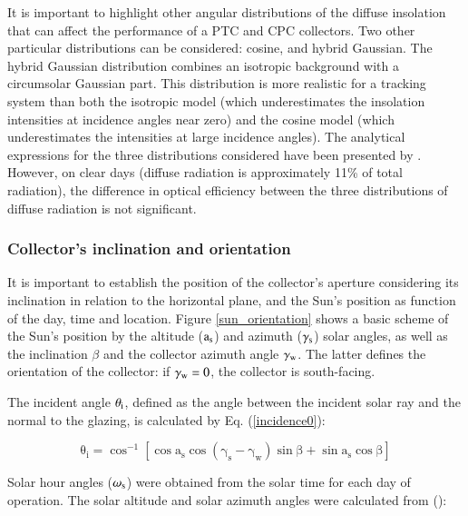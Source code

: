 It is important to highlight other angular distributions of the diffuse insolation that can affect the performance of a PTC and CPC collectors. Two other particular distributions can be considered: cosine, and hybrid Gaussian. The hybrid Gaussian distribution combines an isotropic background with a circumsolar Gaussian part. This distribution is more realistic for a tracking system than both the isotropic model (which underestimates the insolation intensities at incidence angles near zero) and the cosine model (which underestimates the intensities at large incidence angles). The analytical expressions for the three distributions considered have been presented by \citet{Prapas1987}. However, on clear days (diffuse radiation is approximately 11\% of total radiation), the difference in optical efficiency between the three distributions of diffuse radiation is not significant.

\subsubsection{Collector's inclination and orientation}

It is important to establish the position of the collector's aperture considering its inclination in relation to the horizontal plane, and the Sun's position as function of the day, time and location. Figure \ref{sun_orientation} shows a basic scheme of the Sun's position by the altitude ($\rm{a_s}$) and azimuth ($\rm{\gamma_s}$) solar angles, as well as the inclination $\beta$ and the collector azimuth angle $\rm{\gamma_w}$. The latter defines the orientation of the collector: if $\rm{\gamma_w} = 0$, the collector is south-facing.


The incident angle $\theta_{\rm{i}}$, defined as the angle between the incident solar ray and the normal to the glazing, is calculated by Eq. (\ref{incidence0}):

\begin{equation}
	\mathrm{\theta_i = {\cos ^{-1}}\left[ {\cos {a_s}\cos ({\gamma_s} - {\gamma_w})\sin \beta  + \sin {a_s}\cos \beta} \right]}
	\label{incidence0}
\end{equation}

Solar hour angles ($\omega_{\rm{s}}$) were obtained from the solar time for each day of operation. The solar altitude and solar azimuth angles were calculated from (\cite{Duffie2013}):

